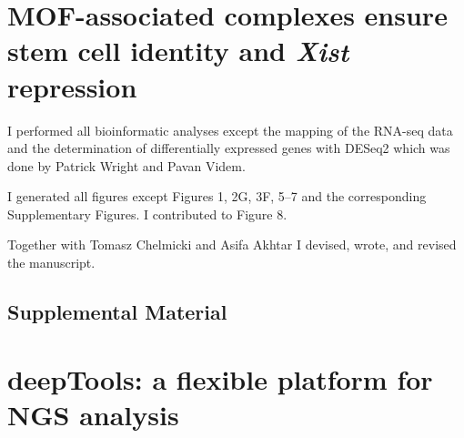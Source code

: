 \section{MOF-associated complexes ensure stem cell identity and \textit{Xist} repression}
\label{SuppPub_MSL} 

\begin{center}
\noindent{}
\end{center}

I performed all bioinformatic analyses except the mapping of the RNA-seq data and the determination of differentially expressed genes with DESeq2 which was done by Patrick Wright and Pavan Videm.

I generated all figures except Figures 1, 2G, 3F, 5--7 and the corresponding Supplementary Figures. I contributed to Figure 8. 

Together with Tomasz Chelmicki and Asifa Akhtar I devised, wrote, and revised the manuscript. 

%
\subsection{Supplemental Material}

\clearpage
\section{deepTools: a flexible platform for NGS analysis}
\label{SuppPub_deepTools}

\begin{center}
\noindent{}
\end{center}

